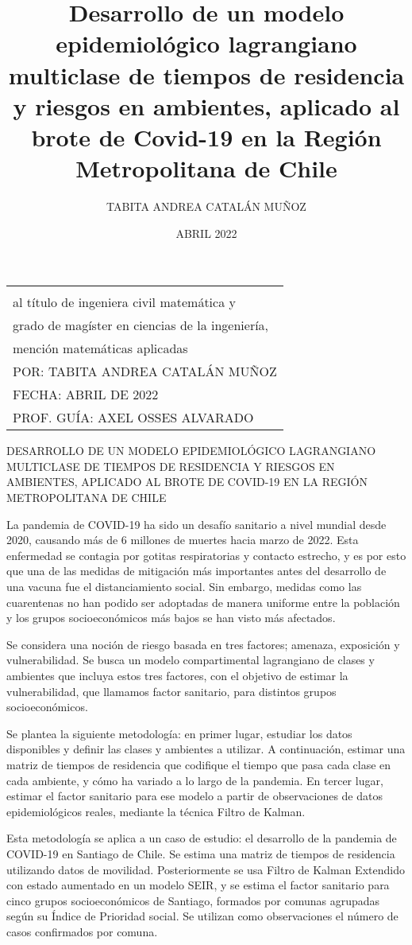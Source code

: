 \documentclass[upright, contnum]{umemoria}
\author{TABITA ANDREA CATALÁN MUÑOZ}
\title{Desarrollo de un modelo epidemiológico lagrangiano multiclase de tiempos de residencia y riesgos en ambientes, aplicado al brote de Covid-19 en la Región Metropolitana de Chile}
\date{ABRIL 2022}
\def\tablaresumen {
\begin{tabular}{l}
	\MakeUppercase{RESUMEN DE LA MEMORIA PARA OPTAR \\
	al título de ingeniera civil matemática y \\
	grado de magíster en ciencias de la ingeniería,\\
	mención matemáticas aplicadas}\\
	POR: \MakeUppercase{Tabita Andrea Catalán Muñoz} \\
	FECHA: \MakeUppercase{Abril de 2022} \\
	PROF. GUÍA: \MakeUppercase{Axel Osses Alvarado}
\end{tabular}
}
\begin{document}
\frontmatter
\maketitle

\cleardoublepage
\begin{flushleft}
	\small
	\tablaresumen
\end{flushleft}

\begin{center}
	\MakeUppercase{Desarrollo de un modelo epidemiológico lagrangiano multiclase de tiempos de residencia y riesgos en ambientes, aplicado al brote de Covid-19 en la Región Metropolitana de Chile}
\end{center} \newp

La pandemia de COVID-19 ha sido un desafío sanitario a nivel mundial desde 2020, causando más de 6 millones de muertes hacia marzo de 2022. Esta enfermedad se contagia por gotitas respiratorias y contacto estrecho, y es por esto que una de las medidas de mitigación más importantes antes del desarrollo de una vacuna fue el distanciamiento social. Sin embargo, medidas como las cuarentenas no han podido ser adoptadas de manera uniforme entre la población y los grupos socioeconómicos más bajos se han visto más afectados.

Se considera una noción de riesgo basada en tres factores; amenaza, exposición y vulnerabilidad. Se busca un modelo compartimental lagrangiano de clases y ambientes que incluya estos tres factores, con el objetivo de estimar la vulnerabilidad, que llamamos factor sanitario, para distintos grupos socioeconómicos.

Se plantea la siguiente metodología: en primer lugar, estudiar los datos disponibles y definir las clases y ambientes a utilizar. A continuación, estimar una matriz de tiempos de residencia que codifique el tiempo que pasa cada clase en cada ambiente, y cómo ha variado a lo largo de la pandemia. En tercer lugar, estimar el factor sanitario para ese modelo a partir de observaciones de datos epidemiológicos reales, mediante la técnica Filtro de Kalman.

Esta metodología se aplica a un caso de estudio: el desarrollo de la pandemia de COVID-19 en Santiago de Chile. Se estima una matriz de tiempos de residencia utilizando datos de movilidad. Posteriormente se usa Filtro de Kalman Extendido con estado aumentado en un modelo SEIR, y se estima el factor sanitario para cinco grupos socioeconómicos de Santiago, formados por comunas agrupadas según su Índice de Prioridad social. Se utilizan como observaciones el número de casos confirmados por comuna. %
\end{document}
